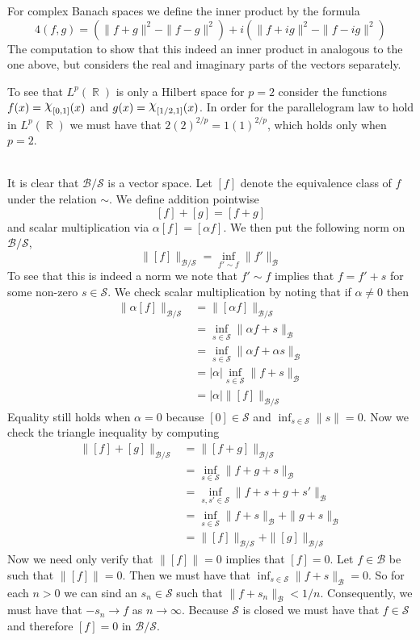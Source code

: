 \documentclass{article}
\DeclareMathOperator{\R}{\mathbb{R}}
\DeclareMathOperator{\capchi}{\raisebox{2pt}{$\mathlarger{\mathlarger{\chi}}$}}
\newcommand{\problem}[1]{\noindent{\textbf{Problem #1}}\\}
\newcommand{\norm}[1]{\|#1\|}
\begin{document}
For complex Banach spaces we define the inner product by the formula
\[
4(f,g) = \left(\norm{f+g}^2 - \norm{f-g}^2\right) + i\left(\norm{f+ig}^2 - \norm{f-ig}^2\right)
\]
The computation to show that this indeed an inner product in analogous to the one above, but considers the real and imaginary parts of the vectors separately.

To see that $L^p(\R)$ is only a Hilbert space for $p = 2$ consider the functions $f(x) = \capchi_{[0,1]}(x)$ and $g(x) = \capchi_{[1/2,1]}(x)$. In order for the parallelogram law to hold in $L^p(\R)$ we must have that $2(2)^{2/p} = 1(1)^{2/p}$, which holds only when $p = 2$. 

\problem{1.8.30} It is clear that $\mathcal{B}/\mathcal{S}$ is a vector space. Let $[f]$ denote the equivalence class of $f$ under the relation $\sim$. We define addition pointwise
\[
[f] + [g] = [f+g]
\]
and scalar multiplication via $\alpha[f] = [\alpha f]$. We then put the following norm on $\mathcal{B}/\mathcal{S}$,
\[
\norm{[f]}_{\mathcal{B}/\mathcal{S}} = \inf_{f' \sim f} \norm{f'}_{\mathcal{B}}
\]
To see that this is indeed a norm we note that $f' \sim f$ implies that $f = f' + s$ for some non-zero $s \in \mathcal{S}$. We check scalar multiplication by noting that if $\alpha \neq 0$ then
\begin{align*}
\norm{\alpha [f]}_{\mathcal{B}/\mathcal{S}} &= \norm{[\alpha f]}_{\mathcal{B}/\mathcal{S}} \\
&= \inf_{s \in \mathcal{S}} \norm{\alpha f + s}_{\mathcal{B}} \\
&= \inf_{s \in \mathcal{S}} \norm{\alpha f + \alpha s}_{\mathcal{B}} \\
&= |\alpha| \inf_{s \in \mathcal{S}} \norm{f + s}_{\mathcal{B}} \\
&= |\alpha| \norm{[f]}_{\mathcal{B}/\mathcal{S}}
\end{align*}
Equality still holds when $\alpha = 0$ because $[0] \in \mathcal{S}$ and $\inf_{s \in \mathcal{S}} \norm{s} = 0$. Now we check the triangle inequality by computing
\begin{align*}
\norm{[f] + [g]}_{\mathcal{B}/\mathcal{S}} &= \norm{[f + g]}_{\mathcal{B}/\mathcal{S}} \\
&= \inf_{s \in \mathcal{S}} \norm{f + g + s}_{\mathcal{B}} \\
&= \inf_{s, s' \in \mathcal{S}} \norm{f + s + g + s'}_{\mathcal{B}} \\
&= \inf_{s \in \mathcal{S}} \norm{f + s}_{\mathcal{B}} + \norm{ g + s}_{\mathcal{B}} \\
&= \norm{[f]}_{\mathcal{B}/\mathcal{S}} + \norm{[g]}_{\mathcal{B}/\mathcal{S}}
\end{align*}
Now we need only verify that $\norm{[f]} = 0$ implies that $[f] = 0$. Let $f \in \mathcal{B}$ be such that $\norm{[f]} = 0$. Then we must have that $\inf_{s \in \mathcal{S}} \norm{f+s}_{\mathcal{B}} = 0$. So for each $n > 0$ we can sind an $s_n \in \mathcal{S}$ such that $\norm{f + s_n}_{\mathcal{B}} < 1/n$. Consequently, we must have that $-s_n \to f$ as $n \to \infty$. Because $\mathcal{S}$ is closed we must have that $f \in \mathcal{S}$ and therefore $[f] = 0$ in $\mathcal{B}/\mathcal{S}$. 
\end{document}
